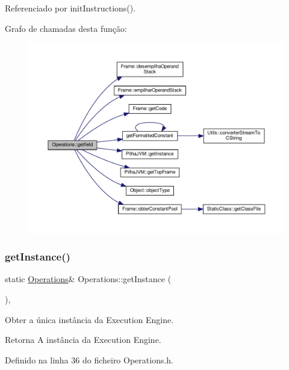 Referenciado por init\+Instructions().

Grafo de chamadas desta função\+:\nopagebreak
\begin{figure}[H]
\begin{center}
\leavevmode
\includegraphics[width=350pt]{classOperations_a0bb399fe0f64dc21699132c092560e19_cgraph}
\end{center}
\end{figure}
\mbox{\label{classOperations_afd99f64338fb7f1d1b813254f005bf9a}} 
\subsubsection{\texorpdfstring{get\+Instance()}{getInstance()}}
{\footnotesize\ttfamily static \hyperlink{classOperations}{Operations}\& Operations\+::get\+Instance (\begin{DoxyParamCaption}{ }\end{DoxyParamCaption})\hspace{0.3cm}{\ttfamily [inline]}, {\ttfamily [static]}}



Obter a única instância da Execution Engine. 

\begin{DoxyReturn}{Retorna}
A instância da Execution Engine. 
\end{DoxyReturn}


Definido na linha 36 do ficheiro Operations.\+h.



